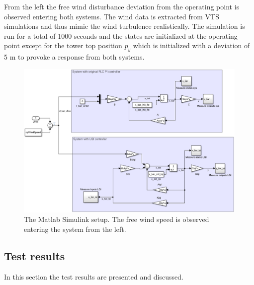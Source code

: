 From the left the free wind disturbance deviation from the operating point is observed entering both systems. The wind data is extracted from VTS simulations and thus mimic the wind turbulence realistically. The simulation is run for a total of 1000 seconds and the states are initialized at the operating point except for the tower top position $ p_y $ which is initialized with a deviation of 5 m to provoke a response from both systems.
\begin{figure}[ht]
	\centering
	\includegraphics[width=0.95\linewidth]{Graphics/TestResults/linearModPerf/simulink_setup2.png}
	\caption{The Matlab Simulink setup. The free wind speed is observed entering the system from the left.}
	\label{fig:simulink_setup2}
\end{figure}

\subsection{Test results}
In this section the test results are presented and discussed.


